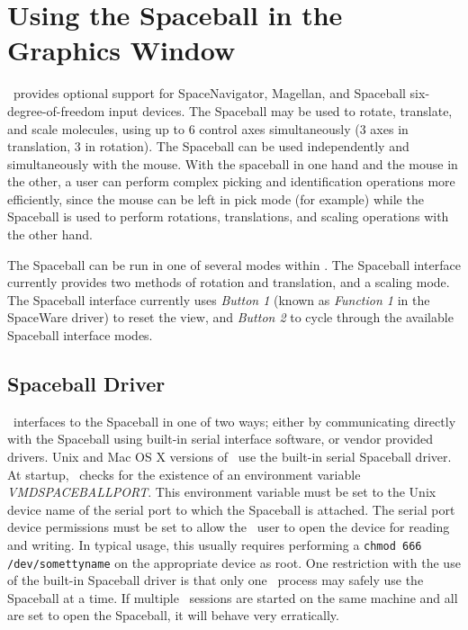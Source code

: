 %
%
%

\section{Using the Spaceball in the Graphics Window}
\label{ug:spaceball}

\VMD\ provides optional support for SpaceNavigator, Magellan, and
Spaceball six-degree-of-freedom input devices.  
The Spaceball may be used to rotate, translate, and scale molecules,
using up to 6 control axes simultaneously (3 axes in translation, 
3 in rotation).  The Spaceball can be used independently and
simultaneously with the mouse.  With the spaceball in one hand and the 
mouse in the other, a user can perform complex picking and identification
operations more efficiently, since the mouse can be left in pick mode
(for example) while the Spaceball is used to perform rotations, 
translations, and scaling operations with the other hand. 

The Spaceball can be run in one of several modes within \VMD. 
The Spaceball interface currently provides two methods of rotation 
and translation, and a scaling mode.  The Spaceball interface
currently uses {\em Button 1} (known as {\em Function 1} in the SpaceWare
driver) to reset the view, and {\em Button 2} to cycle through the
available Spaceball interface modes.

\subsection{Spaceball Driver}
\VMD\ interfaces to the Spaceball in one of two 
ways; either by communicating directly with the Spaceball using 
built-in serial interface software, or vendor provided drivers.
Unix and Mac OS X versions of \VMD\ use the built-in serial Spaceball driver.
At startup, \VMD\ checks for the existence of an environment
variable {\em VMDSPACEBALLPORT}.  This environment variable must be
set to the Unix device name of the serial port to which the Spaceball
is attached.  The serial port device permissions must be set to allow
the \VMD\ user to open the device for reading and writing.  In typical
usage, this usually requires performing a {\tt chmod 666 /dev/somettyname} 
on the appropriate device as root.
One restriction with the use of the built-in Spaceball driver is that
only one \VMD\ process may safely use the Spaceball at a time.  If multiple
\VMD\ sessions are started on the same machine and all are set to open
the Spaceball, it will behave very erratically.

